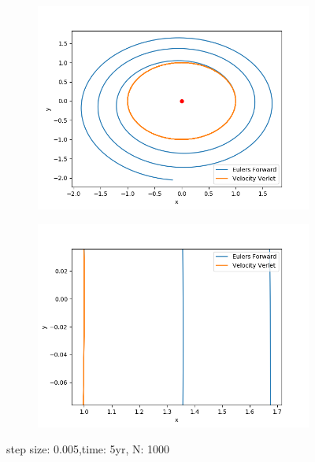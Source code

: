 \documentclass{article}
\begin{document}
\begin{figure}[H]
  \centering
  \begin{subfigure}{0.5\textwidth}
    \centering
    \includegraphics[width=1.0\textwidth]{plots/compare_h005.png}
  \end{subfigure}%
  \begin{subfigure}{0.5\textwidth}
    \centering
    \includegraphics[width=1.0\textwidth]{plots/compare_h005_zoom.png}
  \end{subfigure}
  \caption{step size: 0.005,time: 5yr, N: 1000}
\end{figure}
\end{document}
